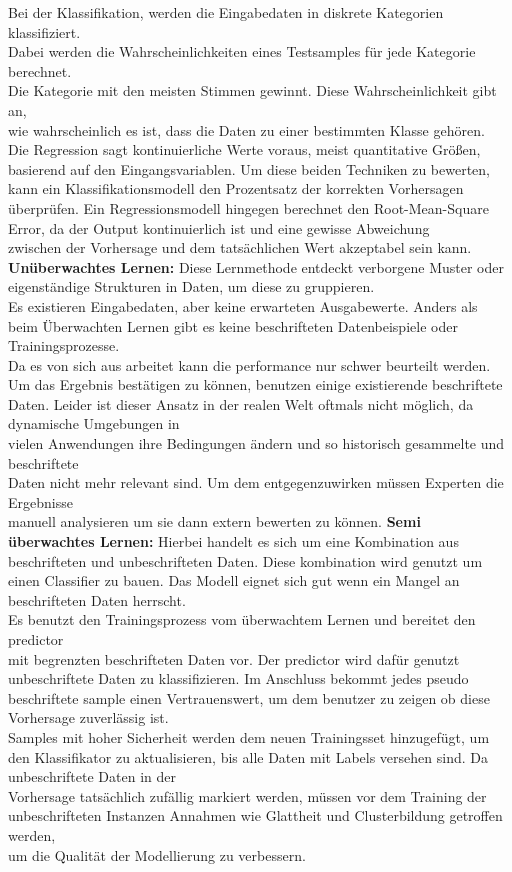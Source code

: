 \newpage
Bei der Klassifikation, werden die Eingabedaten in diskrete Kategorien klassifiziert. \\ Dabei werden die Wahrscheinlichkeiten eines Testsamples für jede Kategorie berechnet. \\ Die Kategorie mit den meisten Stimmen gewinnt. Diese Wahrscheinlichkeit gibt an, \\ wie wahrscheinlich es ist, dass die Daten zu einer bestimmten Klasse gehören\cite{Lernen}.
\\
Die Regression sagt kontinuierliche Werte voraus, meist quantitative Größen, basierend auf den Eingangsvariablen. Um diese beiden Techniken zu bewerten, kann ein Klassifikationsmodell den Prozentsatz der korrekten Vorhersagen überprüfen. Ein Regressionsmodell hingegen berechnet den Root-Mean-Square Error, da der Output kontinuierlich ist und eine gewisse Abweichung \\ zwischen der Vorhersage und dem tatsächlichen Wert akzeptabel sein kann\cite{Lernen}.
\nAbsatz
\textbf{Unüberwachtes Lernen:} Diese Lernmethode entdeckt verborgene Muster oder \\ eigenständige Strukturen in Daten, um diese zu gruppieren. \\ Es existieren Eingabedaten, aber keine erwarteten Ausgabewerte. Anders als beim Überwachten Lernen gibt es keine beschrifteten Datenbeispiele oder Trainingsprozesse. \\ Da es von sich aus arbeitet kann die performance nur schwer beurteilt werden. \\ Um das Ergebnis bestätigen zu können, benutzen einige existierende beschriftete Daten. Leider ist dieser Ansatz in der realen Welt oftmals nicht möglich, da dynamische Umgebungen in \\ vielen Anwendungen ihre Bedingungen ändern und so historisch gesammelte und beschriftete \\ Daten nicht mehr relevant sind. Um dem entgegenzuwirken müssen Experten die Ergebnisse \\ manuell analysieren um sie dann extern bewerten zu können\cite{Lernen}.
\nAbsatz
\textbf{Semi überwachtes Lernen:} Hierbei handelt es sich um eine Kombination aus beschrifteten und unbeschrifteten Daten. Diese kombination wird genutzt um einen Classifier zu bauen. Das Modell eignet sich gut wenn ein Mangel an beschrifteten Daten herrscht. \\ Es benutzt den Trainingsprozess vom überwachtem Lernen und bereitet den predictor \\ mit begrenzten beschrifteten Daten vor. Der predictor wird dafür genutzt unbeschriftete Daten zu klassifizieren. Im Anschluss bekommt jedes pseudo beschriftete sample einen Vertrauenswert, um dem benutzer zu zeigen ob diese Vorhersage zuverlässig ist. \\ Samples mit hoher Sicherheit werden dem neuen Trainingsset hinzugefügt, um den Klassifikator zu aktualisieren, bis alle Daten mit Labels versehen sind. Da unbeschriftete Daten in der \\ Vorhersage tatsächlich zufällig markiert werden, müssen vor dem Training der unbeschrifteten Instanzen Annahmen wie Glattheit und Clusterbildung getroffen werden, \\ um die Qualität der Modellierung zu verbessern\cite{Lernen}.
